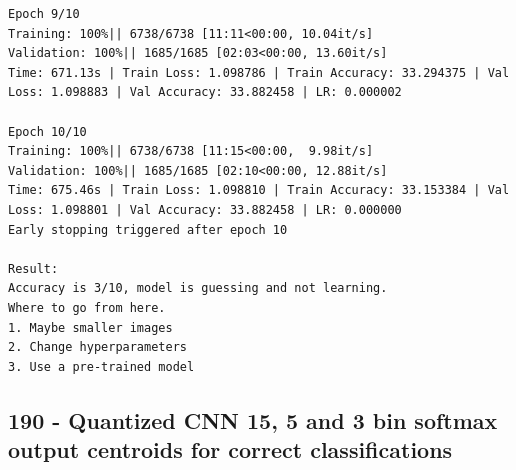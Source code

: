 \begin{verbatim}
Epoch 9/10
Training: 100%|| 6738/6738 [11:11<00:00, 10.04it/s]
Validation: 100%|| 1685/1685 [02:03<00:00, 13.60it/s]
Time: 671.13s | Train Loss: 1.098786 | Train Accuracy: 33.294375 | Val Loss: 1.098883 | Val Accuracy: 33.882458 | LR: 0.000002

Epoch 10/10
Training: 100%|| 6738/6738 [11:15<00:00,  9.98it/s]
Validation: 100%|| 1685/1685 [02:10<00:00, 12.88it/s]
Time: 675.46s | Train Loss: 1.098810 | Train Accuracy: 33.153384 | Val Loss: 1.098801 | Val Accuracy: 33.882458 | LR: 0.000000
Early stopping triggered after epoch 10

Result:
Accuracy is 3/10, model is guessing and not learning.
Where to go from here.
1. Maybe smaller images
2. Change hyperparameters
3. Use a pre-trained model

\end{verbatim}

\subsection{190 - Quantized CNN 15, 5 and 3 bin softmax output centroids for correct classifications}
\label{app_res:190}

